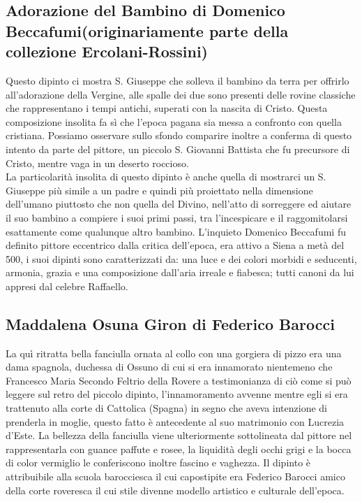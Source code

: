 \documentclass[hidelinks,12pt,a4paper]{article}
\begin{document}
\begin{flushleft}
			\subsection{Adorazione del Bambino di Domenico Beccafumi(originariamente parte della collezione Ercolani-Rossini)}
			Questo dipinto ci mostra S. Giuseppe che solleva il bambino da terra per offrirlo all'adorazione della Vergine, alle spalle dei due sono presenti delle rovine classiche che rappresentano i tempi antichi, superati con la nascita di Cristo. Questa composizione insolita fa sì che l'epoca pagana sia messa a confronto con quella cristiana. Possiamo osservare sullo sfondo comparire inoltre a conferma di questo intento da parte del pittore, un piccolo S. Giovanni Battista che fu precursore di Cristo, mentre vaga in un deserto roccioso.\\
			La particolarità insolita di questo dipinto è anche quella di mostrarci un S. Giuseppe più simile a un padre e quindi più proiettato nella dimensione dell'umano piuttosto che non quella del Divino, nell'atto di sorreggere ed aiutare il suo bambino a compiere i suoi primi passi, tra l'incespicare e il raggomitolarsi esattamente come qualunque altro bambino. L'inquieto Domenico Beccafumi fu definito pittore eccentrico dalla critica dell'epoca, era attivo a Siena a metà del 500, i suoi dipinti sono caratterizzati da: una luce e dei colori morbidi e seducenti, armonia, grazia e una composizione dall'aria irreale e fiabesca; tutti canoni da lui appresi dal celebre Raffaello.
	
			\subsection{Maddalena Osuna Giron di Federico Barocci}
			La quì ritratta bella fanciulla ornata al collo con una gorgiera di pizzo era una dama spagnola, duchessa di Ossuno di cui si era innamorato nientemeno che Francesco Maria Secondo Feltrio della Rovere a testimonianza di ciò  come si può leggere sul retro del piccolo dipinto, l'innamoramento avvenne mentre egli si era trattenuto alla corte di Cattolica (Spagna) in segno che aveva intenzione di prenderla in moglie, questo fatto è antecedente al suo matrimonio con Lucrezia d'Este. La bellezza della fanciulla viene ulteriormente sottolineata dal pittore nel rappresentarla con guance paffute e rosee, la liquidità degli occhi grigi e la bocca di color vermiglio le conferiscono inoltre fascino e vaghezza. Il dipinto è attribuibile alla scuola barocciesca il cui capostipite era Federico Barocci amico della corte roveresca il cui stile divenne modello artistico e culturale dell'epoca.
	

\end{flushleft}
\end{document}
